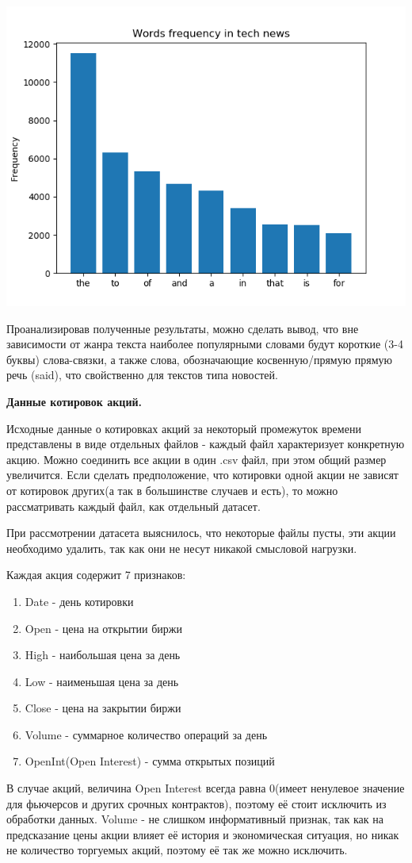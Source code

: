 \includegraphics[width=0.5\linewidth]{src/tech.png}

Проанализировав полученные результаты, можно сделать вывод, что вне зависимости от жанра текста наиболее популярными словами будут короткие (3-4 буквы) слова-связки, а также слова, обозначающие косвенную/прямую прямую речь (said), что свойственно для текстов типа новостей.

\lstset{  
    caption=\lstname
}


{\bfseries Данные котировок акций.}

Исходные данные о котировках акций за некоторый промежуток времени представлены в виде отдельных файлов - каждый файл характеризует конкретную акцию. Можно соединить все акции в один .csv файл, при этом общий размер увеличится. Если сделать предположение, что котировки одной акции не зависят от котировок других(а так в большинстве случаев и есть), то можно рассматривать каждый файл, как отдельный датасет.

При рассмотрении датасета выяснилось, что некоторые файлы пусты, эти акции необходимо удалить, так как они не несут никакой смысловой нагрузки.

Каждая акция содержит 7 признаков:
\begin{enumerate}
    \item Date - день котировки
    \item Open - цена на открытии биржи
    \item High - наибольшая цена за день
    \item Low - наименьшая цена за день
    \item Close - цена на закрытии биржи
    \item Volume - суммарное количество операций за день
    \item OpenInt(Open Interest) - сумма открытых позиций
\end{enumerate}

В случае акций, величина Open Interest всегда равна 0(имеет ненулевое значение для фьючерсов и других срочных контрактов), поэтому её стоит исключить из обработки данных. Volume - не слишком информативный признак, так как на предсказание цены акции влияет её история и экономическая ситуация, но никак не количество торгуемых акций, поэтому её так же можно исключить.

